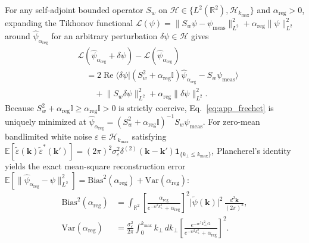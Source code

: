 \documentclass[aps,pra,reprint,nofootinbib,floatfix,longbibliography]{revtex4-2}
\theoremstyle{remark}
\newcommand{\braket}[2]{\langle #1 | #2 \rangle}
\newcommand{\norm}[1]{\lVert #1 \rVert}
\newcommand{\abs}[1]{\lvert #1 \rvert}
\begin{document}
For any self-adjoint bounded operator $S_w$ on $\mathcal{H} \in \{L^2(\mathbb{R}^2), \mathcal{H}_{k_{\max}}\}$ and $\alpha_{\mathrm{reg}} > 0$, expanding the Tikhonov functional $\mathcal{L}(\psi) = \norm{S_w\psi - \psi_{\mathrm{meas}}}_{L^2}^2 + \alpha_{\mathrm{reg}}\norm{\psi}_{L^2}^2$ around $\hat{\psi}_{\alpha_{\mathrm{reg}}}$ for an arbitrary perturbation $\delta\psi \in \mathcal{H}$ gives
\begin{align}
&\mathcal{L}(\hat{\psi}_{\alpha_{\mathrm{reg}}}+\delta\psi) - \mathcal{L}(\hat{\psi}_{\alpha_{\mathrm{reg}}}) \nonumber \\
&\quad = 2\operatorname{Re}\braket{\delta\psi}{(S_w^2 + \alpha_{\mathrm{reg}}\mathbb{I})\hat{\psi}_{\alpha_{\mathrm{reg}}} - S_w\psi_{\mathrm{meas}}} \nonumber \\
&\qquad + \norm{S_w\delta\psi}_{L^2}^2 + \alpha_{\mathrm{reg}}\norm{\delta\psi}_{L^2}^2.
\label{eq:app_frechet}
\end{align}
Because $S_w^2 + \alpha_{\mathrm{reg}}\mathbb{I} \ge \alpha_{\mathrm{reg}}\mathbb{I} > 0$ is strictly coercive, Eq.~\eqref{eq:app_frechet} is uniquely minimized at $\hat{\psi}_{\alpha_{\mathrm{reg}}} = (S_w^2 + \alpha_{\mathrm{reg}}\mathbb{I})^{-1}S_w\psi_{\mathrm{meas}}$. For zero-mean bandlimited white noise $\varepsilon \in \mathcal{H}_{k_{\max}}$ satisfying $\mathbb{E}[\widetilde{\varepsilon}(\mathbf{k})\widetilde{\varepsilon}^*(\mathbf{k}')] = (2\pi)^2\sigma_\varepsilon^2\delta^{(2)}(\mathbf{k}-\mathbf{k}')\mathbf{1}_{\{k_\perp \le k_{\max}\}}$, Plancherel's identity yields the exact mean-square reconstruction error $\mathbb{E}[\norm{\hat{\psi}_{\alpha_{\mathrm{reg}}} - \psi}_{L^2}^2] = \mathrm{Bias}^2(\alpha_{\mathrm{reg}}) + \mathrm{Var}(\alpha_{\mathrm{reg}})$:
\begin{align}
\mathrm{Bias}^2(\alpha_{\mathrm{reg}}) &= \int_{\mathbb{R}^2} \left[\frac{\alpha_{\mathrm{reg}}}{e^{-w^2 k_\perp^2} + \alpha_{\mathrm{reg}}}\right]^2 \abs{\widetilde{\psi}(\mathbf{k})}^2\,\frac{d^2\mathbf{k}}{(2\pi)^2}, \nonumber \\
\mathrm{Var}(\alpha_{\mathrm{reg}}) &= \frac{\sigma_\varepsilon^2}{2\pi}\int_0^{k_{\max}} k_\perp\,dk_\perp \left[\frac{e^{-w^2 k_\perp^2/2}}{e^{-w^2 k_\perp^2} + \alpha_{\mathrm{reg}}}\right]^2.
\label{eq:app_bias_var_general}
\end{align}
\end{document}
